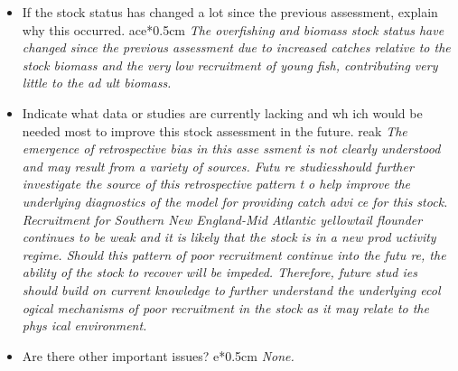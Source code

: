 {\begin{itemize}{}
be any changes that were made to the current stock assessment, beyond incorpora
ting additional years of data and the affect these changes had on the assessmen
t and stock status. \linebreak{} \hspace*{0.5cm} \textit{ There were no major c
hanges to the current stock assessment formulation. However, the criterion for 
determining acceptable tows on the NEFSC surveys were revised for years the Big
elow year (i.e. 2009-2011) and carried foreward to ensure consistency between t
he assessment and deck operations. The influence of the revised protocol on the
 survey indices was inconsequential.} \item{}If the stock status has changed a 
lot since the previous assessment, explain why this occurred. \linebreak{} \hsp
ace*{0.5cm} \textit{The overfishing and biomass stock status have changed since
 the previous assessment due to increased catches relative to the stock biomass
 and the very low recruitment of young fish, contributing very little to the ad
ult biomass.} \item{}Indicate what data or studies are currently lacking and wh
ich would be needed most to improve this stock assessment in the future. \lineb
reak{} \hspace*{0.5cm} \textit{The emergence of retrospective bias in this asse
ssment is not clearly understood and may result from a variety of sources. Futu
re studiesshould further investigate the source of this retrospective pattern t
o help improve the underlying diagnostics of the model for providing catch advi
ce for this stock. Recruitment for Southern New England-Mid Atlantic yellowtail
 flounder continues to be weak and it is likely that the stock is in a new prod
uctivity regime. Should this pattern of poor recruitment continue into the futu
re, the ability of the stock to recover will be impeded. Therefore, future stud
ies should build on current knowledge to further understand the underlying ecol
ogical mechanisms of poor recruitment in the stock as it may relate to the phys
ical environment.} \item{}Are there other important issues? \linebreak{} \hspac
e*{0.5cm} \textit{None. } \end{itemize}{}} \def\YELSNEMARefr{ \textbf{Reference
s: }{} \linebreak{} Alade, L, C. Legault, S.Cadrin. 2008. In. Northeast Fisheri
es Science Center. 2008. Assessment of 19 Northeast Groundfish Stocks through 2
}
